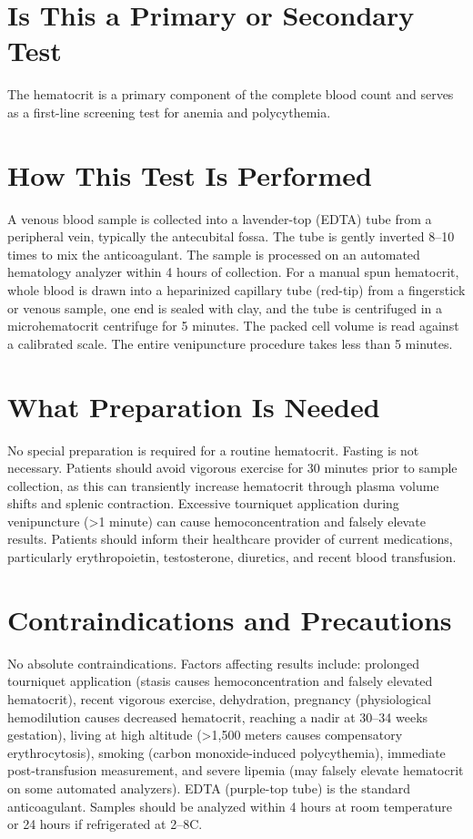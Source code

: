 \section*{Is This a Primary or Secondary Test}
The hematocrit is a primary component of the complete blood count and serves as a first-line screening test for anemia and polycythemia.

\section*{How This Test Is Performed}
A venous blood sample is collected into a lavender-top (EDTA) tube from a peripheral vein, typically the antecubital fossa. The tube is gently inverted 8--10 times to mix the anticoagulant. The sample is processed on an automated hematology analyzer within 4 hours of collection. For a manual spun hematocrit, whole blood is drawn into a heparinized capillary tube (red-tip) from a fingerstick or venous sample, one end is sealed with clay, and the tube is centrifuged in a microhematocrit centrifuge for 5 minutes. The packed cell volume is read against a calibrated scale. The entire venipuncture procedure takes less than 5 minutes.

\section*{What Preparation Is Needed}
No special preparation is required for a routine hematocrit. Fasting is not necessary. Patients should avoid vigorous exercise for 30 minutes prior to sample collection, as this can transiently increase hematocrit through plasma volume shifts and splenic contraction. Excessive tourniquet application during venipuncture (>1 minute) can cause hemoconcentration and falsely elevate results. Patients should inform their healthcare provider of current medications, particularly erythropoietin, testosterone, diuretics, and recent blood transfusion.

\section*{Contraindications and Precautions}
No absolute contraindications. Factors affecting results include: prolonged tourniquet application (stasis causes hemoconcentration and falsely elevated hematocrit), recent vigorous exercise, dehydration, pregnancy (physiological hemodilution causes decreased hematocrit, reaching a nadir at 30--34 weeks gestation), living at high altitude (>1,500 meters causes compensatory erythrocytosis), smoking (carbon monoxide-induced polycythemia), immediate post-transfusion measurement, and severe lipemia (may falsely elevate hematocrit on some automated analyzers). EDTA (purple-top tube) is the standard anticoagulant. Samples should be analyzed within 4 hours at room temperature or 24 hours if refrigerated at 2--8\textdegree{}C.

